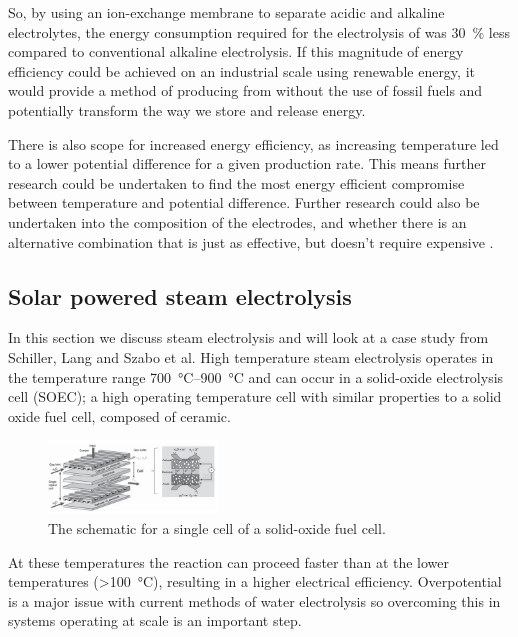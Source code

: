 So, by using an ion-exchange membrane to separate acidic and alkaline electrolytes, the energy consumption required for the electrolysis of  was \SI{30}{\percent} less compared to conventional alkaline electrolysis.
If this magnitude of energy efficiency could be achieved on an industrial scale using renewable energy, it would provide a method of producing  from  without the use of fossil fuels and potentially transform the way we store and release energy.

There is also scope for increased energy efficiency, as increasing temperature led to a lower potential difference for a given  production rate.
This means further research could be undertaken to find the most energy efficient compromise between temperature and potential difference.
Further research could also be undertaken into the composition of the electrodes, and whether there is an alternative combination that is just as effective, but doesn’t require expensive .

\subsection{Solar powered steam electrolysis}%
\label{sub:solar_powered_steam_electrolysis}
\cite{Schiller2019}

In this section we discuss steam electrolysis and will look at a case study from Schiller, Lang and Szabo et al\cite{Schiller2019}.
High temperature steam electrolysis operates in the temperature range \SIrange{700}{900}{\celsius}\cite{Schiller2019} and can occur in a solid-oxide electrolysis cell (SOEC); a high operating temperature cell with similar properties to a solid oxide fuel cell, composed of ceramic\cite{Laurencin}.
\begin{figure}[H]
	\centering
	\includegraphics[width=0.4\textwidth]{cf89a71a-2c53-11eb-895f-8c8590753a48.png}
	\caption{The schematic for a single cell of a solid-oxide fuel cell.}
	\label{fig:SE_cell}
\end{figure}
At these temperatures the reaction can proceed faster than at the lower temperatures (\SI{>100}{\celsius}), resulting in a higher electrical efficiency\cite{Schiller2019}.
Overpotential is a major issue with current methods of water electrolysis so overcoming this in systems operating at scale is an important step.

